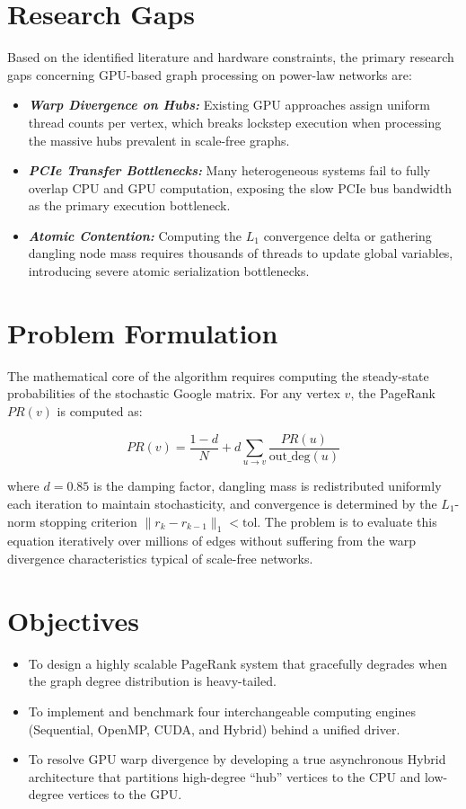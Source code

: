 \documentclass[12pt,a4paper]{article}
\begin{document}
	\section{Research Gaps}
	Based on the identified literature and hardware constraints, the primary research gaps concerning GPU-based graph processing on power-law networks are:
	\begin{itemize}
		\item \textit{\textbf{Warp Divergence on Hubs:}} Existing GPU approaches assign uniform thread counts per vertex, which breaks lockstep execution when processing the massive hubs prevalent in scale-free graphs.
		\item \textit{\textbf{PCIe Transfer Bottlenecks:}} Many heterogeneous systems fail to fully overlap CPU and GPU computation, exposing the slow PCIe bus bandwidth as the primary execution bottleneck.
        \item \textit{\textbf{Atomic Contention:}} Computing the $L_1$ convergence delta or gathering dangling node mass requires thousands of threads to update global variables, introducing severe atomic serialization bottlenecks.
	\end{itemize}

	\newpage
	\section{Problem Formulation}
	The mathematical core of the algorithm requires computing the steady-state probabilities of the stochastic Google matrix. For any vertex $v$, the PageRank $PR(v)$ is computed as:

    \begin{equation}
        PR(v) = \frac{1-d}{N} + d \sum_{u \rightarrow v} \frac{PR(u)}{\text{out\_deg}(u)}
    \end{equation}

    \noindent where $d = 0.85$ is the damping factor, dangling mass is redistributed uniformly each iteration to maintain stochasticity, and convergence is determined by the $L_1$-norm stopping criterion $\lVert r_k - r_{k-1} \rVert_1 < \text{tol}$. The problem is to evaluate this equation iteratively over millions of edges without suffering from the warp divergence characteristics typical of scale-free networks.
	
	\section{Objectives}
	\begin{itemize}
	\item To design a highly scalable PageRank system that gracefully degrades when the graph degree distribution is heavy-tailed.
    \item To implement and benchmark four interchangeable computing engines (Sequential, OpenMP, CUDA, and Hybrid) behind a unified driver.
    \item To resolve GPU warp divergence by developing a true asynchronous Hybrid architecture that partitions high-degree ``hub'' vertices to the CPU and low-degree vertices to the GPU.
	\end{itemize}
	
\end{document}
